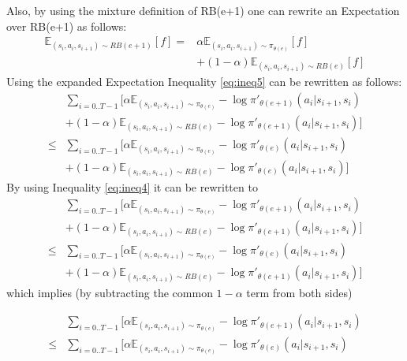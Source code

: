 \documentclass{article}
\begin{document}
Also, by using the mixture definition of RB(e+1) one can rewrite an Expectation over RB(e+1) as follows:
\begin{equation}
\begin{aligned}
\mathbb{E}_{(s_i,a_i,s_{i+1}) \sim RB(e+1)} [f] =  & \alpha \mathbb{E}_{(s_i,a_i,s_{i+1}) \sim \pi_{\theta(e)}} [f]
\\
& +(1-\alpha) \mathbb{E}_{(s_i,a_i,s_{i+1}) \sim RB(e)} [f]
\end{aligned}
\end{equation}
Using the expanded Expectation Inequality \ref{eq:ineq5} can be rewritten as follows:
\begin{equation}
\begin{aligned}
& \sum_{i = 0..T-1}  [ \alpha \mathbb{E}_{(s_i,a_i,s_{i+1}) \sim \pi_{\theta(e)}} - \log \pi'_{\theta(e+1)}(a_{i}|s_{i+1},s_i)
\\
& +(1-\alpha) \mathbb{E}_{(s_i,a_i,s_{i+1}) \sim RB(e)} - \log \pi'_{\theta(e+1)}(a_{i}|s_{i+1},s_i) ]
\\
\leq
& \sum_{i = 0..T-1}  [ \alpha \mathbb{E}_{(s_i,a_i,s_{i+1}) \sim \pi_{\theta(e)}} - \log \pi'_{\theta(e)}(a_{i}|s_{i+1},s_i)
\\
& +(1-\alpha) \mathbb{E}_{(s_i,a_i,s_{i+1}) \sim RB(e)} - \log \pi'_{\theta(e)}(a_{i}|s_{i+1},s_i) ]
\end{aligned}
\end{equation}
By using Inequality \ref{eq:ineq4} it can be rewritten to
\begin{equation}
\begin{aligned}
& \sum_{i = 0..T-1}  [ \alpha \mathbb{E}_{(s_i,a_i,s_{i+1}) \sim \pi_{\theta(e)}} - \log \pi'_{\theta(e+1)}(a_{i}|s_{i+1},s_i)
\\
& +(1-\alpha) \mathbb{E}_{(s_i,a_i,s_{i+1}) \sim RB(e)} - \log \pi'_{\theta(e+1)}(a_{i}|s_{i+1},s_i) ]
\\
\leq
& \sum_{i = 0..T-1}  [ \alpha \mathbb{E}_{(s_i,a_i,s_{i+1}) \sim \pi_{\theta(e)}} - \log \pi'_{\theta(e)}(a_{i}|s_{i+1},s_i)
\\
& +(1-\alpha) \mathbb{E}_{(s_i,a_i,s_{i+1}) \sim RB(e)} - \log \pi'_{\theta(e+1)}(a_{i}|s_{i+1},s_i) ]
\end{aligned}
\end{equation}
which implies (by subtracting the common $1-\alpha$ term from both sides) 

\begin{equation}
\begin{aligned}
& \sum_{i = 0..T-1}  [ \alpha \mathbb{E}_{(s_i,a_i,s_{i+1}) \sim \pi_{\theta(e)}} - \log \pi'_{\theta(e+1)}(a_{i}|s_{i+1},s_i)
\\
\leq
& \sum_{i = 0..T-1}  [ \alpha \mathbb{E}_{(s_i,a_i,s_{i+1}) \sim \pi_{\theta(e)}} - \log \pi'_{\theta(e)}(a_{i}|s_{i+1},s_i)
\end{aligned}
\end{equation}
\end{document}
